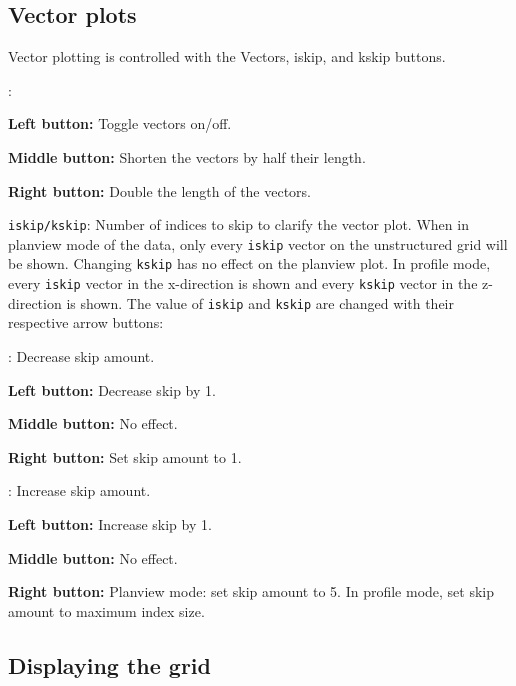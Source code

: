 \subsection{Vector plots}

Vector plotting is controlled with the Vectors, iskip, and kskip buttons.
\begin{list}{}
\item {}:
\begin{list}{}
\item {\bf Left button:} Toggle vectors on/off.
\item {\bf Middle button:} Shorten the vectors by half their length.
\item {\bf Right button:} Double the length of the vectors.
\end{list}
\begin{list}{}
\item \verb+iskip/kskip+: Number of indices to skip to clarify the vector plot.
When in planview mode of the data, only every \verb+iskip+ vector on the unstructured
grid will be shown. Changing \verb+kskip+ has no
effect on the planview plot.
In profile mode, every \verb+iskip+ vector in the x-direction is shown and 
every \verb+kskip+ vector in the z-direction is shown.  The value of \verb+iskip+
and \verb+kskip+ are changed with their respective arrow buttons:
\begin{list}{}
\item \button{$<$}: Decrease skip amount.
\begin{list}{}
\item {\bf Left button:} Decrease skip by 1.
\item {\bf Middle button:} No effect.
\item {\bf Right button:} Set skip amount to 1.
\end{list}
\item \button{$>$}: Increase skip amount.
\begin{list}{}
\item {\bf Left button:} Increase skip by 1.
\item {\bf Middle button:} No effect.
\item {\bf Right button:} Planview mode: set skip amount to 5.  In profile mode, set skip
amount to maximum index size.
\end{list}
\end{list}
\end{list}
\end{list}

\subsection{Displaying the grid}

